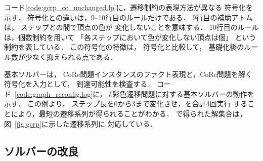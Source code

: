 コード\ref{code:gcrp_cc_unchanged.lp}に，遷移制約の表現方法が異なる
符号化を示す．
符号化との違いは，9--10行目のルールだけである．
9行目の補助アトムは，
ステップとの間で頂点の色が
変化しないことを意味する．
10行目のルールは，個数制約を用いて
「各ステップにおいて色が変化しない頂点は個」
という制約を表している．
この符号化の特徴は，
符号化と比較して，
基礎化後のルール数が少なく抑えられる点である．

基本ソルバーは，
CoRe問題インスタンスのファクト表現と，CoRe問題を解く符号化を入力として，
到達可能性を検査する．
コード~\ref{code:graph_reconfig.log}に，
$k$彩色遷移問題に対する基本ソルバーの動作を示す．
この例より，
ステップ長を0から3まで変化させ，{\clingo}を合計4回実行
することにより，最短の遷移系列が得られることがわかる．
で得られた解集合は，図~\ref{fig:gcrp}に示した遷移系列に
対応している．








\subsection{ソルバーの改良} \label{sec:improved_solver}

